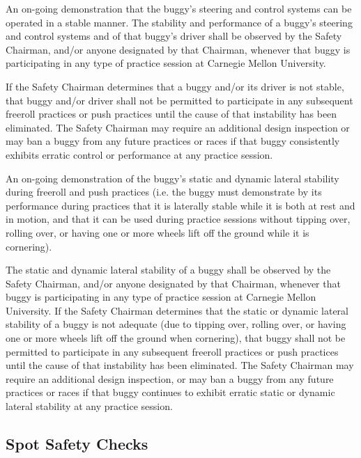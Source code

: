 \documentclass[openany]{book}
\begin{document}
An on-going demonstration that the buggy's steering and control systems can be operated in a stable manner. The stability and performance of a buggy's steering and control systems and of that buggy's driver shall be observed by the Safety Chairman, and/or anyone designated by that Chairman, whenever that buggy is participating in any type of practice session at Carnegie Mellon University.

If the Safety Chairman determines that a buggy and/or its driver is not stable, that buggy and/or driver shall not be permitted to participate in any subsequent freeroll practices or push practices until the cause of that instability has been eliminated. The Safety Chairman may require an additional design inspection or may ban a buggy from any future practices or races if that buggy consistently exhibits erratic control or performance at any practice session.

An on-going demonstration of the buggy's static and dynamic lateral stability during freeroll and push practices (i.e. the buggy must demonstrate by its performance during practices that it is laterally stable while it is both at rest and in motion, and that it can be used during practice sessions without tipping over, rolling over, or having one or more wheels lift off the ground while it is cornering).

The static and dynamic lateral stability of a buggy shall be observed by the Safety Chairman, and/or anyone designated by that Chairman, whenever that buggy is participating in any type of practice session at Carnegie Mellon University. If the Safety Chairman determines that the static or dynamic lateral stability of a buggy is not adequate (due to tipping over, rolling over, or having one or more wheels lift off the ground when cornering), that buggy shall not be permitted to participate in any subsequent freeroll practices or push practices until the cause of that instability has been eliminated. The Safety Chairman may require an additional design inspection, or may ban a buggy from any future practices or races if that buggy continues to exhibit erratic static or dynamic lateral stability at any practice session.

\subsection{Spot Safety Checks}
\end{document}
